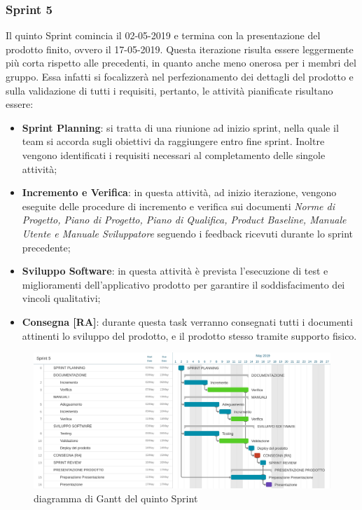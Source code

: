 \clearpage
\subsubsection{Sprint 5}
Il quinto Sprint comincia il 02-05-2019 e termina con la presentazione del prodotto finito, ovvero il 17-05-2019. Questa iterazione risulta essere leggermente più corta rispetto alle precedenti, in quanto anche meno onerosa per i membri del gruppo. Essa infatti si focalizzerà nel perfezionamento dei dettagli del prodotto e sulla validazione di tutti i requisiti, pertanto, le attività pianificate risultano essere:
	\begin{itemize}
		\item \textbf{Sprint Planning}: si tratta di una riunione ad inizio sprint, nella quale il team si accorda sugli obiettivi da raggiungere entro fine sprint. Inoltre vengono identificati i requisiti necessari al completamento delle singole attività;
		\item \textbf{Incremento e Verifica}: in questa attività, ad inizio iterazione, vengono eseguite delle procedure di incremento e verifica sui documenti \emph{Norme di Progetto, Piano di Progetto, Piano di Qualifica, Product Baseline, Manuale Utente e Manuale Sviluppatore} seguendo i feedback ricevuti durante lo sprint precedente;
		\item \textbf{Sviluppo Software}: in questa attività è prevista l'esecuzione di test e miglioramenti dell'applicativo prodotto per garantire il soddisfacimento dei vincoli qualitativi;
		\item \textbf{Consegna [RA]}: durante questa task verranno consegnati tutti i documenti attinenti lo sviluppo del prodotto, e il prodotto stesso tramite supporto fisico.
	\end{itemize}
\begin{figure}[htbp]
	\centering
	\includegraphics[width=15cm,keepaspectratio]{../includes/pics/grafici/Sprint_5.jpeg}
	\caption{\label{fig:gantt-sprint5}diagramma di Gantt del quinto Sprint}
\end{figure}





